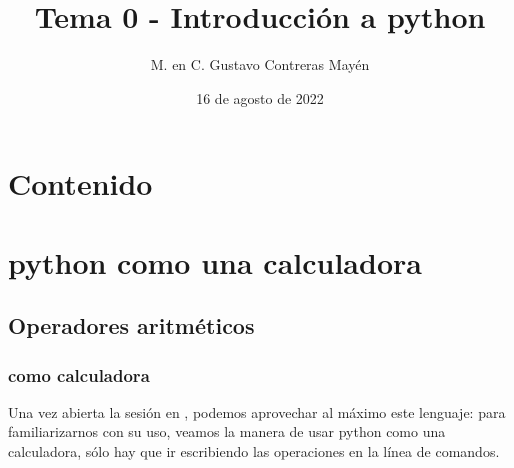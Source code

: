\documentclass[12pt]{beamer}
\title{Tema 0 - Introducción a python}
\author{M. en C. Gustavo Contreras Mayén}
\date{16 de agosto de 2022}
\begin{document}
\maketitle

\section*{Contenido}
\fontsize{14}{14}\selectfont
{}


\section{python como una calculadora}
\subsection{Operadores aritméticos}

\begin{frame}
\frametitle{\python{} como calculadora}
Una vez abierta la sesión en \python, podemos aprovechar al máximo este lenguaje: \pause para familiarizarnos con su uso, veamos la manera de usar python como una calculadora, sólo hay que ir escribiendo las operaciones en la línea de comandos.
\end{frame}
\end{document}
